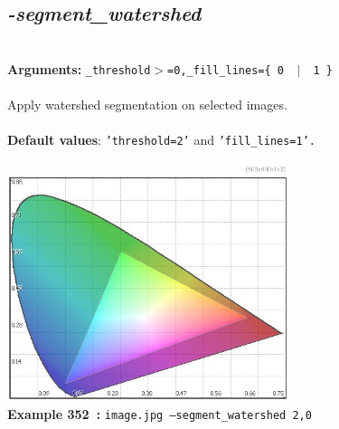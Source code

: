 \documentclass[a4paper,11pt,twoside]{book}
\begin{document}
\subsection{\emph{-segment\_watershed} }\vspace*{-0.5em}
~\\\textbf{Arguments: } 
{\small \texttt{\_threshold$>$=0,\_fill\_lines=\{ 0 ~$|$~ 1 \}}}\\~\\
Apply watershed segmentation on selected images.
~\\~\\\textbf{Default values}: {\small \texttt{'threshold=2'} and \texttt{'fill\_lines=1'.}}
\begin{center}\includegraphics[keepaspectratio=true,height=7cm,width=\textwidth]{img/gmic_def352.jpg}\\
{\footnotesize \textbf{Example 352~:} \texttt{image.jpg --segment\_watershed 2,0}}
\end{center}
\end{document}
